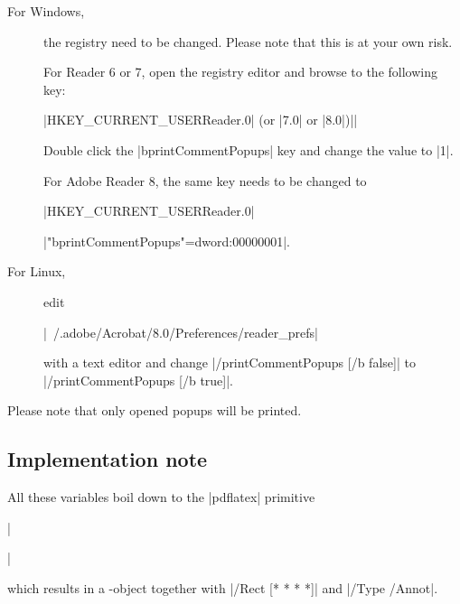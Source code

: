 \documentclass[a4paper]{ltxdoc}
\begin{document}
\begin{description}
	\item[For Windows,]
 the registry need to be changed. Please note that this is at your own risk.

For Reader 6 or 7, open the registry editor and browse to the following key:

|HKEY_CURRENT_USER\Software\ADOBE\Acrobat Reader\6.0| (or |7.0| or |8.0|)|\Annots\cPrefs|

Double click the |bprintCommentPopups| key and change the value to |1|.

For Adobe Reader 8, the same key needs to be changed to 

|HKEY_CURRENT_USER\Software\Adobe\Acrobat Reader\8.0\Annots\cPrefs|

|"bprintCommentPopups"=dword:00000001|.
	\item[For Linux,]
edit

|~/.adobe/Acrobat/8.0/Preferences/reader_prefs| 

with a text editor and change |/printCommentPopups [/b false]| to |/printCommentPopups [/b true]|.
\end{description}
Please note that only opened popups will be printed.

\subsection{Implementation note}
All these variables boil down to the |pdflatex| primitive

\noindent
||

\noindent
which results in a \pdf-object together with |/Rect [* * * *]| and |/Type /Annot|.
\end{document}
